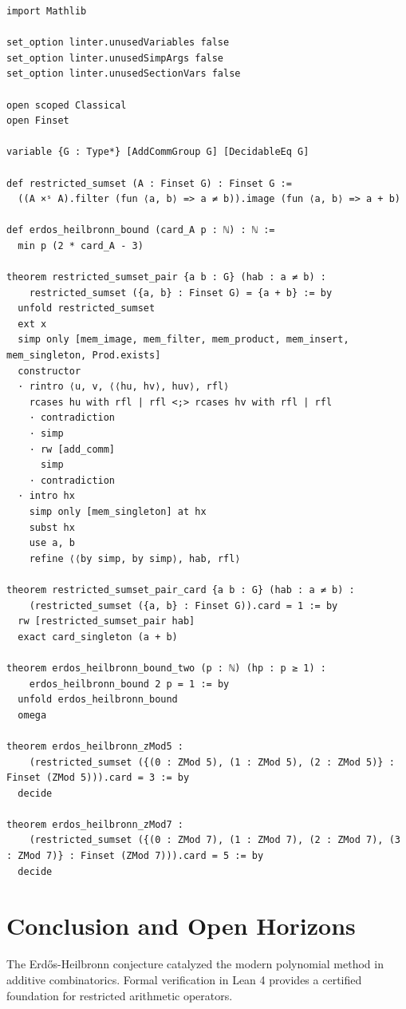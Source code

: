 \documentclass[11pt,a4paper]{article}
\theoremstyle{definition}
\begin{document}
\begin{lstlisting}[caption={Formal Lean 4 Implementation of Erdős-Heilbronn Restricted Sumsets}]
import Mathlib

set_option linter.unusedVariables false
set_option linter.unusedSimpArgs false
set_option linter.unusedSectionVars false

open scoped Classical
open Finset

variable {G : Type*} [AddCommGroup G] [DecidableEq G]

def restricted_sumset (A : Finset G) : Finset G :=
  ((A ×ˢ A).filter (fun ⟨a, b⟩ => a ≠ b)).image (fun ⟨a, b⟩ => a + b)

def erdos_heilbronn_bound (card_A p : ℕ) : ℕ :=
  min p (2 * card_A - 3)

theorem restricted_sumset_pair {a b : G} (hab : a ≠ b) :
    restricted_sumset ({a, b} : Finset G) = {a + b} := by
  unfold restricted_sumset
  ext x
  simp only [mem_image, mem_filter, mem_product, mem_insert, mem_singleton, Prod.exists]
  constructor
  · rintro ⟨u, v, ⟨⟨hu, hv⟩, huv⟩, rfl⟩
    rcases hu with rfl | rfl <;> rcases hv with rfl | rfl
    · contradiction
    · simp
    · rw [add_comm]
      simp
    · contradiction
  · intro hx
    simp only [mem_singleton] at hx
    subst hx
    use a, b
    refine ⟨⟨by simp, by simp⟩, hab, rfl⟩

theorem restricted_sumset_pair_card {a b : G} (hab : a ≠ b) :
    (restricted_sumset ({a, b} : Finset G)).card = 1 := by
  rw [restricted_sumset_pair hab]
  exact card_singleton (a + b)

theorem erdos_heilbronn_bound_two (p : ℕ) (hp : p ≥ 1) :
    erdos_heilbronn_bound 2 p = 1 := by
  unfold erdos_heilbronn_bound
  omega

theorem erdos_heilbronn_zMod5 :
    (restricted_sumset ({(0 : ZMod 5), (1 : ZMod 5), (2 : ZMod 5)} : Finset (ZMod 5))).card = 3 := by
  decide

theorem erdos_heilbronn_zMod7 :
    (restricted_sumset ({(0 : ZMod 7), (1 : ZMod 7), (2 : ZMod 7), (3 : ZMod 7)} : Finset (ZMod 7))).card = 5 := by
  decide
\end{lstlisting}

\section{Conclusion and Open Horizons}
The Erd\H{o}s-Heilbronn conjecture catalyzed the modern polynomial method in additive combinatorics. Formal verification in Lean 4 provides a certified foundation for restricted arithmetic operators.
\end{document}
